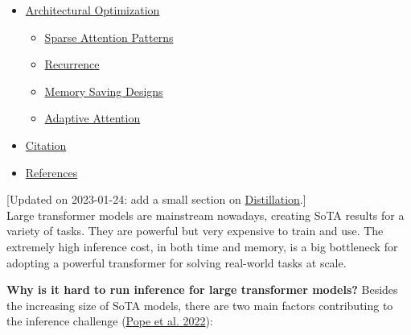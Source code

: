\begin{itemize}
  \begin{itemize}
  \tightlist
  \item
    \hyperref[nm-sparsity-via-pruning]{N:M Sparsity via Pruning}
  \item
    \hyperref[sparsified-transformer]{Sparsified Transformer}
  \item
    \hyperref[mixture-of-experts]{Mixture-of-Experts}

    \begin{itemize}
    \tightlist
    \item
      \hyperref[routing-strategy-improvement]{Routing Strategy Improvement}
    \item
      \hyperref[kernel-improvement]{Kernel Improvement}
    \end{itemize}
  \end{itemize}
\item
  \hyperref[architectural-optimization]{Architectural Optimization}

  \begin{itemize}
  \tightlist
  \item
    \hyperref[sparse-attention-patterns]{Sparse Attention Patterns}
  \item
    \hyperref[recurrence]{Recurrence}
  \item
    \hyperref[memory-saving-designs]{Memory Saving Designs}
  \item
    \hyperref[adaptive-attention]{Adaptive Attention}
  \end{itemize}
\item
  \hyperref[citation]{Citation}
\item
  \hyperref[references]{References}
\end{itemize}

{{[}Updated on 2023-01-24: add a small section on \hyperref[distillation]{Distillation}.{]}}\\

Large transformer models are mainstream nowadays, creating SoTA results for a variety of tasks. They are powerful but very expensive to train and use. The extremely high inference cost, in both time and memory, is a big bottleneck for adopting a powerful transformer for solving real-world tasks at scale.

\textbf{Why is it hard to run inference for large transformer models?} Besides the increasing size of SoTA models, there are two main factors contributing to the inference challenge (\href{https://arxiv.org/abs/2211.05102}{Pope et al. 2022}):

